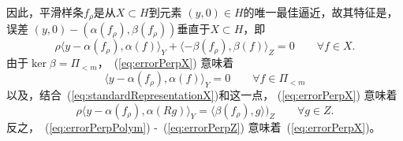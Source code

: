 因此，平滑样条$f_{\rho}$是从$X\subset H$到元素
$(y,0)\in H$的唯一最佳逼近，故其特征是，误差
$(y,0)-(\alpha(f_{\rho}),\beta(f_{\rho}))$垂直于$X\subset H$，即
\begin{equation}
  \label{eq:errorPerpX}
  \rho \langle y-\alpha(f_{\rho}),\alpha(f) \rangle_{Y}
  +\langle -\beta(f_{\rho}),\beta(f) \rangle_{Z}=0
  \qquad \forall f\in X.
\end{equation}
由于$\ker\beta=\Pi_{<m}$，~(\ref{eq:errorPerpX}) 意味着
\begin{equation}
  \label{eq:errorPerpPolym}
  \langle y-\alpha(f_{\rho}),\alpha(f) \rangle_{Y}=0
  \qquad \forall f\in \Pi_{<m}
\end{equation}
以及，结合~(\ref{eq:standardRepresentationX})和这一点，
(\ref{eq:errorPerpX}) 意味着
\begin{equation}
  \label{eq:errorPerpZ}
  \rho\langle y-\alpha(f_{\rho}),\alpha(Rg) \rangle_{Y}
  =\langle \beta(f_{\rho}),g \rangle)_{Z}
  \qquad \forall g\in Z.
\end{equation}
反之，~(\ref{eq:errorPerpPolym}) -~(\ref{eq:errorPerpZ})
 意味着~(\ref{eq:errorPerpX})。

